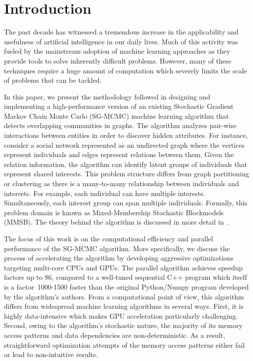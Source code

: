 \section{Introduction}

The past decade has witnessed a tremendous increase in the applicability and
usefulness of artificial intelligence in our daily lives. Much of this activity
was fueled by the mainstream adoption of machine learning approaches as they
provide tools to solve inherently difficult problems.
%
However, many of these techniques require a huge amount of computation
which severely limits the
scale of problems that can be tackled.

In this paper, we present the methodology followed in designing and
implementing a high-performance version of an existing Stochastic Gradient Markov Chain
Monte Carlo (SG-MCMC) machine learning algorithm that detects overlapping
communities in graphs. The algorithm analyzes pair-wise interactions between
entities in order to discover hidden attributes.
%
For instance, consider a social network represented as an undirected graph
where the vertices represent individuals and edges represent relations between
them. Given the relation information, the algorithm can identify latent groups
of individuals that represent shared interests.
%
This problem structure differs from graph partitioning or clustering as there
is a many-to-many relationship between individuals and interests. For example,
each individual can have multiple interests. Simultaneously, each interest group can
span multiple individuals.
%
Formally, this problem domain is known as Mixed-Membership Stochastic
Blockmodels (MMSB). The theory behind the algorithm is discussed in more detail
in~\cite{DBLP:journals/corr/LiAW15}.

The focus of this work is on the computational efficiency and parallel
performance of the SG-MCMC algorithm. More specifically, we discuss the process
of accelerating the algorithm by developing aggressive optimizations targeting
multi-core CPUs and GPUs. The parallel algorithm achieves speedup factors up to 86, compared to a
well-tuned sequential C++ program which itself is a factor~1000-1500 faster than
the original Python/Numpy program developed by the algorithm's authors. From a
computational point of view, this algorithm differs from widespread machine
learning algorithms in several ways. First, it is highly data-intensive which
makes GPU acceleration particularly challenging. Second, owing
to the algorithm's stochastic nature, the majority of its memory access
patterns and data dependencies are non-deterministic. As a result,
straightforward
optimization attempts of the memory access patterns either fail or lead
to non-intuitive results.

